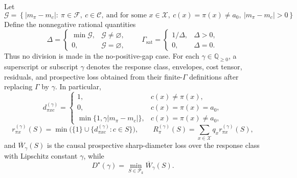 Let
\[
\mathcal G
=\left\{|m_\pi-m_c|:\ \pi\in\mathcal F,\ c\in\mathcal C,
\ \text{and for some }x\in\mathcal X,
\ c(x)=\pi(x)\neq a_0,\ |m_\pi-m_c|>0\right\}.
\]
Define the nonnegative rational quantities
\[
\Delta=
\begin{cases}
\min\mathcal G,&\mathcal G\neq\varnothing,\\
0,&\mathcal G=\varnothing,
\end{cases}
\qquad
\Gamma_{\mathrm{sat}}=
\begin{cases}
1/\Delta,&\Delta>0,\\
0,&\Delta=0.
\end{cases}                                                        \tag{11}
\]
Thus no division is made in the no-positive-gap case.  For each
\(\gamma\in\mathbb Q_{\geq0}\), a superscript or subscript \(\gamma\)
denotes the response class, envelopes, cost tensor, residuals, and
prospective loss obtained from their finite-\(\Gamma\) definitions after
replacing \(\Gamma\) by \(\gamma\).  In particular,
\[
d^{(\gamma)}_{\pi xc}=
\begin{cases}
1,&c(x)\neq\pi(x),\\
0,&c(x)=\pi(x)=a_0,\\
\min\{1,\gamma|m_\pi-m_c|\},&c(x)=\pi(x)\neq a_0,
\end{cases}
\]
\[
r^{(\gamma)}_{\pi x}(S)
=\min\bigl(\{1\}\cup\{d^{(\gamma)}_{\pi xc}:c\in S\}\bigr),
\qquad
R^{(\gamma)}_\pi(S)=\sum_{x\in\mathcal X}q_x
r^{(\gamma)}_{\pi x}(S),
\]
and \(\overline W_\gamma(S)\) is the causal prospective sharp-diameter
loss over the response class with Lipschitz constant \(\gamma\), while
\[
D^\star(\gamma)=\min_{S\in\mathcal P_k}\overline W_\gamma(S).
\]

